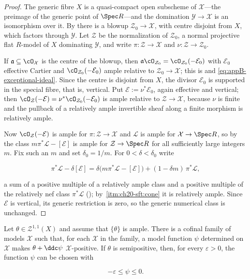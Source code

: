 \begin{proof}
The generic fibre $X$ is a quasi-compact open subscheme of
$\mathcal X$---the preimage of the generic point of $\Spec R$---and the
domination $\mathcal Y\to\mathcal X$ is an isomorphism over it.  By
 there is a blowup
$\mathcal Z_0\to\mathcal X$, with centre disjoint from $X$, which
factors through $\mathcal Y$.  Let $\mathcal Z$ be the normalization of
$\mathcal Z_0$, a normal projective flat $R$-model of $X$ dominating
$\mathcal Y$, and write $\pi:\mathcal Z\to\mathcal X$ and
$\nu:\mathcal Z\to\mathcal Z_0$.

If $\mathfrak a\subseteq\cO_{\mathcal X}$ is the centre of the blowup,
then $\mathfrak a\cO_{\mathcal Z_0}=\cO_{\mathcal Z_0}(-\mathcal E_0)$
with $\mathcal E_0$ effective Cartier and
$\cO_{\mathcal Z_0}(-\mathcal E_0)$ ample relative to
$\mathcal Z_0\to\mathcal X$; this is
 and
\eqref{eq:appB-exceptional-ideal}.  Since the centre is disjoint from
$X$, the divisor $\mathcal E_0$ is supported in the special fibre, that
is, vertical.  Put $\mathcal E:=\nu^*\mathcal E_0$, again effective and
vertical; then
$\cO_{\mathcal Z}(-\mathcal E)=\nu^*\cO_{\mathcal Z_0}(-\mathcal E_0)$ is
ample relative to $\mathcal Z\to\mathcal X$, because $\nu$ is finite and
the pullback of a relatively ample invertible sheaf along a finite morphism
is relatively ample.

Now $\cO_{\mathcal Z}(-\mathcal E)$ is ample for
$\pi:\mathcal Z\to\mathcal X$ and $\mathcal L$ is ample for
$\mathcal X\to\Spec R$, so by \cite[4.6.13]{EGAII} the class
$m\pi^*\mathcal L-[\mathcal E]$ is ample for
$\mathcal Z\to\Spec R$ for all sufficiently large integers $m$.  Fix
such an $m$ and set $\delta_0=1/m$.  For $0<\delta<\delta_0$ write

\[
 \pi^*\mathcal L-\delta[\mathcal E]
 =\delta\bigl(m\pi^*\mathcal L-[\mathcal E]\bigr)
  +(1-\delta m)\,\pi^*\mathcal L ,
\]

a sum of a positive multiple of a relatively ample class and a positive
multiple of the relatively nef class $\pi^*\mathcal L$
(); by
\,\cref{itm:ch20-sft:cone} it is relatively
ample.  Since $\mathcal E$ is vertical, its generic restriction is zero,
so the generic numerical class is unchanged.
\end{proof}

\begin{proposition}\label{prop:ch20-positive-representative}
Let $\theta\in\mathcal Z^{1,1}(X)$ and assume that
$\{\theta\}$ is ample.  There is a cofinal family of models
$\mathcal X$ such that, for each $\mathcal X$ in the family, a model
function $\psi$ determined on $\mathcal X$ makes
$\theta+\ddc\psi$ $\mathcal X$-positive.  If $\theta$ is
semipositive, then, for every $\varepsilon>0$, the function $\psi$ can
be chosen with

\begin{equation}
\label{eq:ch20-small-positive-representative}
                       -\varepsilon\leq\psi\leq0.
\end{equation}
\end{proposition}

